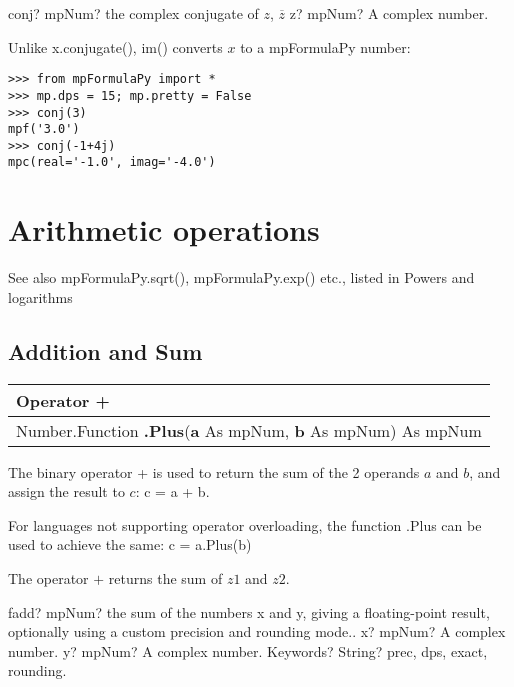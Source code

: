 \vspace{0.6cm}

\begin{mpFunctionsExtract}
	\mpFunctionOne
	{conj? mpNum? the complex conjugate of $z$, $\overline{z}$}
	{z? mpNum? A complex number.}
\end{mpFunctionsExtract}

Unlike x.conjugate(), im() converts $x$ to a mpFormulaPy number:

\begin{lstlisting}
>>> from mpFormulaPy import *
>>> mp.dps = 15; mp.pretty = False
>>> conj(3)
mpf('3.0')
>>> conj(-1+4j)
mpc(real='-1.0', imag='-4.0')
\end{lstlisting}



\newpage
\section{Arithmetic operations}

See also mpFormulaPy.sqrt(), mpFormulaPy.exp() etc., listed in Powers and logarithms


\subsection{Addition and Sum}
\begin{tabular}{p{481pt}}
	\toprule
	\textsf{Operator \textbf{+}}\index{Multiprecision Functions!+} \\
	\midrule
	\textsf{Number.Function \textbf{.Plus}(\textbf{a} As mpNum, \textbf{b} As mpNum) As mpNum}\index{Multiprecision Functions!.Plus} \\
	\bottomrule
\end{tabular}

\vspace{0.3cm}
The binary operator + is used to return the sum of the 2 operands $a$ and $b$, and assign the result to $c$: \textsf{c = a + b}.

For languages not supporting operator overloading, the function \textsf{.Plus} can be used to achieve the same: \textsf{c = a.Plus(b)}


\vspace{0.3cm}
The operator $+$ returns the sum of $z1$ and $z2$.


\vspace{0.3cm}
\begin{mpFunctionsExtract}
	\mpFunctionThree
	{fadd? mpNum? the sum of the numbers x and y, giving a floating-point result, optionally using a custom precision and rounding mode..}
	{x? mpNum? A complex number.}
	{y? mpNum? A complex number.}
	{Keywords? String? prec, dps, exact, rounding.}	
\end{mpFunctionsExtract}

